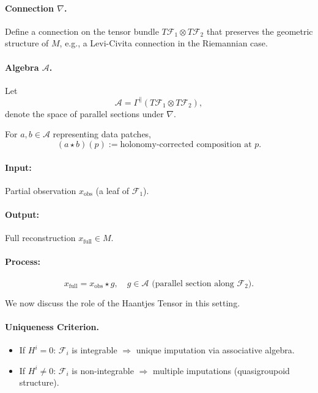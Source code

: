 \documentclass[runningheads]{llncs}
\begin{document}
\paragraph{Connection $\nabla$.}
Define a connection on the tensor bundle $T\mathcal{F}_1 \otimes T\mathcal{F}_2$ that preserves the geometric structure of $M$, e.g., a Levi-Civita connection in the Riemannian case.

\paragraph{Algebra $\mathcal{A}$.}
Let
\[
\mathcal{A} = \Gamma^\parallel(T\mathcal{F}_1 \otimes T\mathcal{F}_2),
\]
denote the space of parallel sections under $\nabla$.

For $a, b \in \mathcal{A}$ representing data patches,
\[
(a \star b)(p) := \text{holonomy-corrected composition at } p.
\]


\paragraph{Input:} Partial observation $x_{\mathrm{obs}}$ (a leaf of $\mathcal{F}_1$).

\paragraph{Output:} Full reconstruction $x_{\mathrm{full}} \in M$.

\paragraph{Process:}
\[
x_{\mathrm{full}} = x_{\mathrm{obs}} \star g, \quad g \in \mathcal{A} \text{ (parallel section along } \mathcal{F}_2).
\]

We now discuss the role of the Haantjes Tensor in this setting. 

\paragraph{Uniqueness Criterion.}
\begin{itemize}
    \item If $H^i = 0$: $\mathcal{F}_i$ is integrable $\Rightarrow$ unique imputation via associative algebra.
    \item If $H^i \neq 0$: $\mathcal{F}_i$ is non-integrable $\Rightarrow$ multiple imputations (quasigroupoid structure).
\end{itemize}
\end{document}
